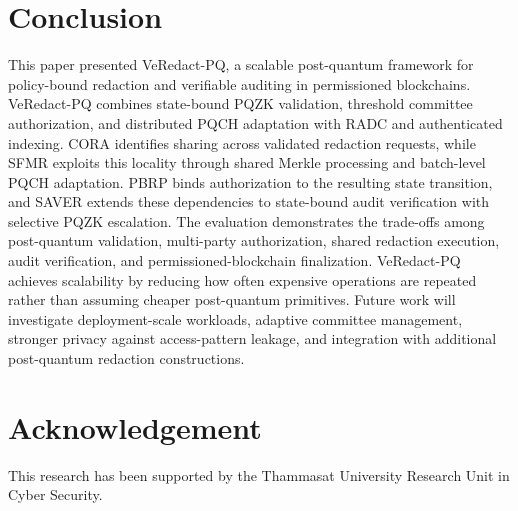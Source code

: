 \documentclass[lettersize,journal]{IEEEtran}
\begin{document}
\section{Conclusion}
\label{sec:conclusion}

This paper presented VeRedact-PQ, a scalable post-quantum framework
for policy-bound redaction and verifiable auditing in permissioned
blockchains. VeRedact-PQ combines state-bound PQZK validation,
threshold committee authorization, and distributed PQCH adaptation
with RADC and authenticated indexing. CORA identifies sharing across
validated redaction requests, while SFMR exploits this locality through
shared Merkle processing and batch-level PQCH adaptation. PBRP binds
authorization to the resulting state transition, and SAVER extends
these dependencies to state-bound audit verification with selective
PQZK escalation. The evaluation demonstrates the trade-offs among post-quantum
validation, multi-party authorization, shared redaction execution,
audit verification, and permissioned-blockchain finalization.
VeRedact-PQ achieves scalability by reducing how often expensive
operations are repeated rather than assuming cheaper post-quantum
primitives. Future work will investigate deployment-scale workloads,
adaptive committee management, stronger privacy against access-pattern
leakage, and integration with additional post-quantum redaction
constructions.
    
 \section{Acknowledgement}
    This research has been supported by the Thammasat University Research Unit in Cyber Security.
    
\end{document}
